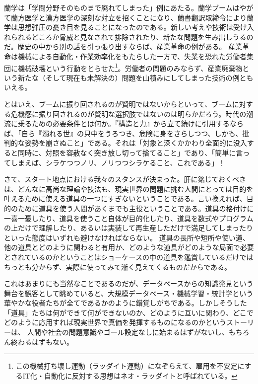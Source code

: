 蘭学は「学問分野そのものまで廃れてしまった」例にあたる。蘭学ブームはやがて蘭方医学と漢方医学の深刻な対立を招くことになり、蘭書翻訳取締令により蘭学は思想弾圧の憂き目を見ることになったのである。新しい考えや技術は受け入れられるどころか脅威と見なされて排除されたり、新たな問題を生み出しうるのだ。歴史の中から別の話を引っ張り出すならば、産業革命の例がある。
産業革命は機械による自動化・作業効率化をもたらした一方で、失業を恐れた労働者集団に機械破壊という行動をとらせた\footnote{この機械打ち壊し運動（ラッダイト運動）になぞらえて、雇用を不安定にするIT化・自動化に反対する思想はネオ・ラッダイトと呼ばれている。}。労働者の問題のみならず、産業廃棄物という新たな（そして現在も未解決の）問題を山積みにしてしまった技術の例ともいえる。

とはいえ、ブームに振り回されるのが賢明ではないからといって、ブームに対する危機感に振り回されるのが賢明な選択肢ではないのは明らかだろう。時代の潮流に乗るための必要条件とは何か。『構造と力』から立て続けに引用するならば、「自ら『濁れる世』の只中をうろつき、危険に身をさらしつつ、しかも、批判的な姿勢を崩さぬこと」である。それは「対象と深くかかわり全面的に没入すると同時に、対照を容赦なく突き放し切って捨てること」であり、「簡単に言ってしまえば、シラケつつノリ、ノリつつシラケること、これである」！

さて、スタート地点における我々のスタンスが決まった。肝に銘じておくべきは、どんなに高尚な理論や技法も、現実世界の問題に挑む人間にとっては目的を叶えるために使える道具の一つにすぎないということである。言い換えれば、目的のために道具を使う人間があくまでも主役ということである。道具の格付けに一喜一憂したり、道具を使うこと自体が目的化したり、道具を数式やプログラムの上だけで理解したり、あるいは実装して再生産しただけで満足してしまったりといった態度はいずれも避けなければならない。
道具の長所や短所や使い道、他の道具とどのように関わると有用か、どのような道具がどのような局面で必要とされているのかということはショーケースの中の道具を鑑賞しているだけではちっとも分からず、実際に使ってみて漸く見えてくるものだからである。

これはあまりにも当然なことであるのだが、データベースからの知識発見という舞台を観客として眺めていると、大規模データベース・機械学習・統計学という華やかな役者たちが全てであるかのように錯覚しがちである。しかしそうした「道具」たちは何ができて何ができないのか、どのように互いに関わり、どこでどのように応用すれば現実世界で真価を発揮するものになるのかというストーリーは、
人間や社会の問題意識やゴール設定なしに始まるはずがないし、もちろん終わるはずもない。

